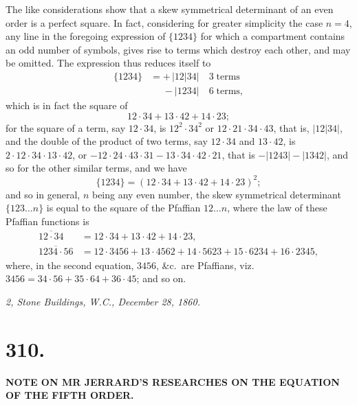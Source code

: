 \documentclass[11pt,a4paper]{article}
\begin{document}
The like considerations show that a skew symmetrical determinant of an even order is a perfect square. In fact, considering for greater simplicity the case $n=4$, any line in the foregoing expression of $\{1234\}$ for which a compartment contains an odd number of symbols, gives rise to terms which destroy each other, and may be omitted. The expression thus reduces itself to
\begin{align*}
\{1234\} &= +\,|12|34|\quad 3\;\text{terms}\\
&\phantom{={}}{}-|1234|\quad 6\;\text{terms},
\end{align*}
which is in fact the square of
\[
12\cdot 34+13\cdot 42+14\cdot 23;
\]
for the square of a term, say $12\cdot 34$, is $12^2\cdot 34^2$ or $12\cdot 21\cdot 34\cdot 43$, that is, $|12|34|$, and the double of the product of two terms, say $12\cdot 34$ and $13\cdot 42$, is $2\cdot 12\cdot 34\cdot 13\cdot 42$, or $-12\cdot 24\cdot 43\cdot 31-13\cdot 34\cdot 42\cdot 21$, that is $-|1243|-|1342|$, and so for the other similar terms, and we have
\[
\{1234\}=(12\cdot 34+13\cdot 42+14\cdot 23)^2;
\]
and so in general, $n$ being any even number, the skew symmetrical determinant $\{123\ldots n\}$ is equal to the square of the Pfaffian $12\ldots n$, where the law of these Pfaffian functions is
\begin{align*}
\overline{12\cdot 34} &= 12\cdot 34+13\cdot 42+14\cdot 23,\\
\overline{1234\cdot 56} &= 12\cdot 3456+13\cdot 4562+14\cdot 5623+15\cdot 6234+16\cdot 2345,
\end{align*}
where, in the second equation, $3456$, \&c.\ are Pfaffians, viz.\ $3456=34\cdot 56+35\cdot 64+36\cdot 45$; and so on.

\medskip

\noindent\textit{2, Stone Buildings, W.C., December 28, 1860.}

\bigskip

\section*{310.}

\begin{center}
\textbf{NOTE ON MR JERRARD'S RESEARCHES ON THE EQUATION OF THE FIFTH ORDER.}
\end{center}
\end{document}
